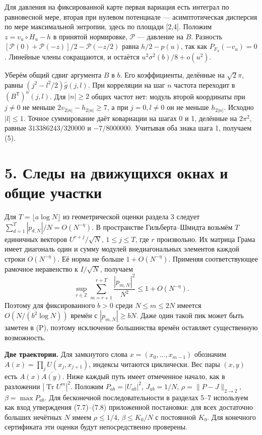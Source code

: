 \documentclass[11pt,a4paper]{article}
\newcommand{\Tr}{\operatorname{Tr}}
\newcommand{\Z}{\mathbb Z}
\newcommand{\sect}[1]{\section*{\sffamily\color{ink}#1}}
\newcommand{\subt}[1]{\par\medskip\noindent\textbf{#1.}\quad}
\begin{document}
Для давления на фиксированной карте первая вариация есть интеграл по равновесной мере, вторая при нулевом потенциале --- асимптотическая дисперсия по мере максимальной энтропии, здесь по площади [2,4]. Положим $z=v_u\circ H_u-h$ в принятой нормировке, $\mathcal P$ --- давление на $B$. Разность $[\mathcal P(0)+\mathcal P(-z)]/2-\mathcal P(-z/2)$ равна $h/2-p(u)$, так как $P_{F_u}(-v_u)=0$. Линейные члены сокращаются, и остаётся $u^2\sigma^2(b)/8+o(u^2)$.

Уберём общий сдвиг аргумента $B$ в $b$. Его коэффициенты, делённые на $\sqrt2\pi$, равны $(j^2-l^2/2)\widehat g(j,l)$. При корреляции на шаг $n$ частота переходит в $(B^\mathsf T)^n(j,l)$. Для $|n|\ge2$ общих частот нет: модуль второй координаты при $j\ne0$ не меньше $2v_{2|n|}-h_{2|n|}\ge7$, а при $j=0,l\ne0$ он не меньше $h_{2|n|}$. Исходно $|l|\le1$. Точное суммирование даёт ковариации на шагах 0 и 1, делённые на $2\pi^2$, равные $313386243/320000$ и $-7/8000000$. Учитывая оба знака шага 1, получаем (5).
\newpage
\sect{5. Следы на движущихся окнах и общие участки}
Для $T=\lfloor a\log N\rfloor$ из геометрической оценки раздела 3 следует $\sum_{d=1}^T|p_{d,N}|/N=O(N^{-\eta})$. В пространстве Гильберта--Шмидта возьмём $T$ единичных векторов $U^{r+j}/\sqrt N$, $1\le j\le T$, где $r$ произвольно. Их матрица Грама имеет диагональ один и сумму модулей внедиагональных элементов каждой строки $O(N^{-\eta})$. Её норма не больше $1+O(N^{-\eta})$. Применяя соответствующее рамочное неравенство к $I/\sqrt N$, получаем
\[
 \sup_{r\in\Z}\sum_{m=r+1}^{r+T}\frac{|p_{m,N}|^2}{N^2}\le1+O(N^{-\eta}).\tag{6}
\]
Поэтому для фиксированного $b>0$ среди $N\le m\le2N$ имеется $O(N/(b^2\log N))$ времён с $|p_{m,N}|\ge bN$. Даже один такой пик может быть заметен в (P), поэтому исключение большинства времён оставляет существенную возможность.

\subt{Две траектории} Для замкнутого слова $x=(x_0,\ldots,x_{m-1})$ обозначим $A(x)=\prod_j U(x_j,x_{j+1})$, индексы читаются циклически. Вес пары $(x,y)$ есть $A(x)\overline{A(y)}$. Ниже каждый путь имеет отмеченное начало, как в разложении $|\Tr U^m|^2$. Положим $P_{ab}=|U_{ab}|^2$, $J_{ab}=1/N$, $\rho=\|P-J\|_{2\to2}$, $\beta=\max P_{ab}$. Для бесконечной последовательности в разделах 5--7 используем как вход утверждения (7.7)--(7.8) приложенной постановки: для всех достаточно больших нечётных $N$ имеем $\rho\le1/4$, $\beta\le K_0/N$ с постоянной $K_0$. Для конечного сертификата эти оценки будут непосредственно проверены.
\end{document}
